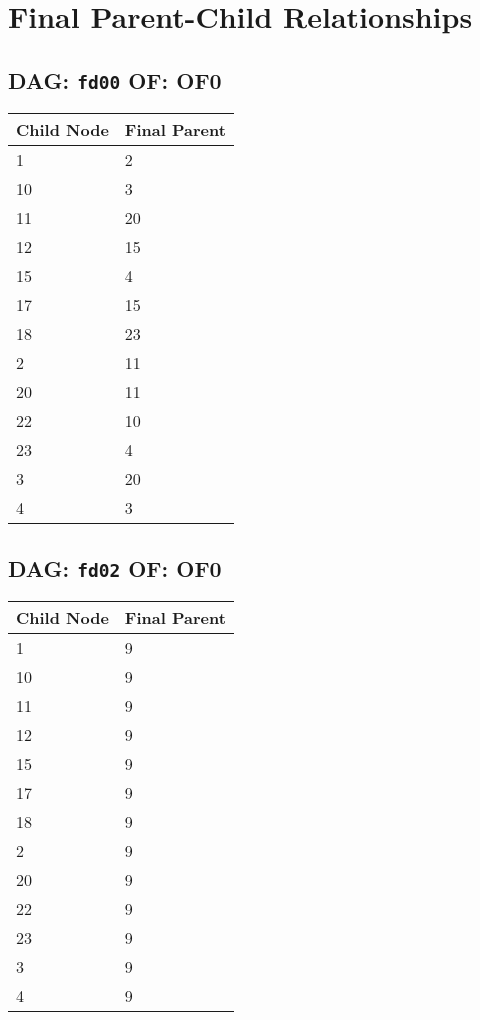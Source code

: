 \documentclass{article}
\begin{document}
\pagestyle{fancy}
\fancyhf{}
\section*{Final Parent-Child Relationships}
\subsection*{DAG: \texttt{fd00} OF: OF0}
\begin{tabular}{ll}
\toprule
\textbf{Child Node} & \textbf{Final Parent} \\
\midrule
1 & 2 \\
10 & 3 \\
11 & 20 \\
12 & 15 \\
15 & 4 \\
17 & 15 \\
18 & 23 \\
2 & 11 \\
20 & 11 \\
22 & 10 \\
23 & 4 \\
3 & 20 \\
4 & 3 \\
\bottomrule
\end{tabular}

\subsection*{DAG: \texttt{fd02} OF: OF0}
\begin{tabular}{ll}
\toprule
\textbf{Child Node} & \textbf{Final Parent} \\
\midrule
1 & 9 \\
10 & 9 \\
11 & 9 \\
12 & 9 \\
15 & 9 \\
17 & 9 \\
18 & 9 \\
2 & 9 \\
20 & 9 \\
22 & 9 \\
23 & 9 \\
3 & 9 \\
4 & 9 \\
\bottomrule
\end{tabular}
\end{document}
